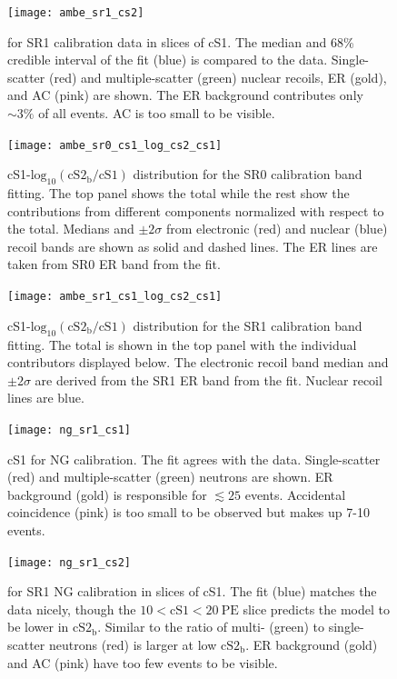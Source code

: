 \begin{figure}
\centering
\texttt{[image: ambe\_sr1\_cs2]}
\caption{\cstwob for SR1 \ambe calibration data in slices of cS1.  The median and 68\% credible interval of the fit (blue) is compared
to the data.  Single-scatter (red) and multiple-scatter (green) nuclear recoils, ER (gold), and AC (pink) are shown.  The ER background
contributes only ${\sim}3\%$ of all events.  AC is too small to be visible.}
\label{fig:er_nr_calibrations_results_ambe_sr1_cs2}
\end{figure}

\begin{figure}
\centering
\texttt{[image: ambe\_sr0\_cs1\_log\_cs2\_cs1]}
\caption{cS1-$\mathrm{log}_{10}(\mathrm{cS2_b / cS1})$ distribution for the SR0 \ambe calibration band fitting.  The top panel shows the
total while the rest show the contributions from different components normalized with respect to the total.  Medians and $\pm 2\sigma$
from electronic (red) and nuclear (blue) recoil bands are shown as solid and dashed lines.  The ER lines are taken from SR0 ER band
from the fit.}
\label{fig:er_nr_calibrations_results_ambe_sr0_cs1_log_cs2_cs1}
\end{figure}

\begin{figure}
\centering
\texttt{[image: ambe\_sr1\_cs1\_log\_cs2\_cs1]}
\caption{cS1-$\mathrm{log}_{10}(\mathrm{cS2_b / cS1})$ distribution for the SR1 \ambe calibration band fitting.  The total is shown
in the top panel with the individual contributors displayed below.  The electronic recoil band median and $\pm 2\sigma$ are derived
from the SR1 ER band from the fit.  Nuclear recoil lines are blue.}
\label{fig:er_nr_calibrations_results_ambe_sr1_cs1_log_cs2_cs1}
\end{figure}

\begin{figure}
\centering
\texttt{[image: ng\_sr1\_cs1]}
\caption{cS1 for NG calibration.  The fit agrees with the data.  Single-scatter (red) and multiple-scatter (green) neutrons are shown.  ER
background (gold) is responsible for $\lesssim 25$ events.  Accidental coincidence (pink) is too small to be observed but makes up
7-10 events.}
\label{fig:er_nr_calibrations_results_ng_sr1_cs1}
\end{figure}

\begin{figure}
\centering
\texttt{[image: ng\_sr1\_cs2]}
\caption{\cstwob for SR1 NG calibration in slices of cS1.  The fit (blue) matches the data nicely, though the
$10 < \mathrm{cS1} < 20\ \mathrm{PE}$ slice predicts the model to be lower in $\mathrm{cS2_b}$.  Similar to \ambe the ratio of multi-
(green) to single-scatter neutrons (red) is larger at low $\mathrm{cS2_b}$.  ER background (gold) and AC (pink) have too few events
to be visible.}
\label{fig:er_nr_calibrations_results_ng_sr1_cs2}
\end{figure}

